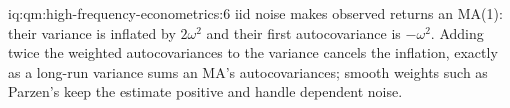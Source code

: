 \begin{solution}{iq:qm:high-frequency-econometrics:6}
iid noise makes observed returns an MA(1): their variance is inflated by $2\omega^2$ and their first autocovariance is $-\omega^2$. Adding twice the weighted autocovariances to the variance
cancels the inflation, exactly as a long-run variance sums an MA's autocovariances; smooth weights such as Parzen's keep the estimate positive and handle dependent noise.
\end{solution}
